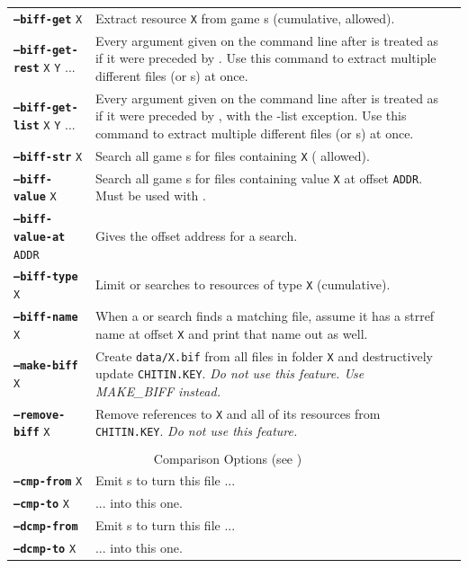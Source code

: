 \documentclass{article}
\def\ttref#1{\ahrefloc{#1}{\tt #1}}
\def\DEFINE#1{{\tt \bf #1}\label{#1}\index{#1}}
\def\t#1{{\tt #1}}
\begin{document}
\begin{tabular}{lp{10in}|p{10in}}
\DEFINE{--biff-get} \t{X}&	Extract resource \t{X} from game \ttref{BIFF}s (cumulative, \ttref{regexp} allowed). \\
\DEFINE{--biff-get-rest} \t{X} \t{Y} ... & Every argument given on the
command line after \ttref{--biff-get-rest} is treated as if it were
preceded by \ttref{--biff-get}. Use this command to extract multiple
different files (or \ttref{regexp}s) at once. \\
\DEFINE{--biff-get-list} \t{X} \t{Y} ... & Every argument given on the
command line after \ttref{--biff-get-rest} is treated as if it were
preceded by \ttref{--biff-get}, with the -list exception. Use this command to extract multiple
different files (or \ttref{regexp}s) at once. \\
\DEFINE{--biff-str} \t{X}&	Search all game \ttref{BIFF}s for files
containing \t{X} (\ttref{regexp} allowed). \\
\DEFINE{--biff-value} \t{X} &   Search all game \ttref{BIFF}s for files
containing value \t{X} at offset \t{ADDR}. Must be used with
\ttref{--biff-value-at}. \\
\DEFINE{--biff-value-at} \t{ADDR} & Gives the offset address for a
\ttref{--biff-value} search. \\
\DEFINE{--biff-type} \t{X}&	Limit \ttref{--biff-str} or
\ttref{--biff-value} searches to
resources of type \t{X} (cumulative). \\
\DEFINE{--biff-name} \t{X}&	When a \ttref{--biff-str} or
\ttref{--biff-value} search finds a
matching file, assume it has a strref name at offset \t{X} and print that
name out as well. \\
\DEFINE{--make-biff} \t{X} & Create \t{data/X.bif} from all files in
folder \t{X} and destructively update \t{CHITIN.KEY}. \emph{Do not use this
feature. Use MAKE_BIFF instead.} \\
\DEFINE{--remove-biff} \t{X} & Remove references to \ttref{BIFF} \t{X} and
all of its resources from \t{CHITIN.KEY}. \emph{Do not use this feature.} \\
\\
\multicolumn{2}{c}{ {\color{red} Comparison Options} (see \ttref{--out})} \\
\DEFINE{--cmp-from} \t{X}&	Emit \ttref{WRITE_BYTE}s to turn this file ... \\
\DEFINE{--cmp-to}   \t{X}&	... into this one. \\
\DEFINE{--dcmp-from}\t{X}&	Emit \ttref{REPLACE}s to turn this \ttref{DLG} file ... \\
\DEFINE{--dcmp-to}  \t{X}&	... into this one. \\

\end{tabular}
\end{document}
